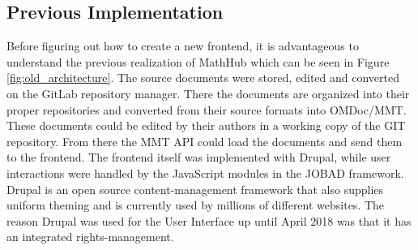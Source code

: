 \documentclass[11pt,a4paper]{article}
\begin{document}
\subsection{Previous Implementation} \label{previous}
Before figuring out how to create a new frontend, it is advantageous to understand the previous realization of MathHub which can be seen in Figure \ref{fig:old_architecture}.
The source documents were stored, edited and converted on the GitLab repository manager.
There the documents are organized into their proper repositories and converted from their source formats into OMDoc/MMT.
These documents could be edited by their authors in a working copy of the GIT repository.
From there the MMT API could load the documents and send them to the frontend.
The frontend itself was implemented with Drupal\cite{comp}, while user interactions were handled by the JavaScript modules in the JOBAD framework.
Drupal is an open source content-management framework that also supplies uniform theming and is currently used by millions of different websites.
The reason Drupal was used for the User Interface up until April 2018 was that it has an integrated rights-management.
\end{document}
